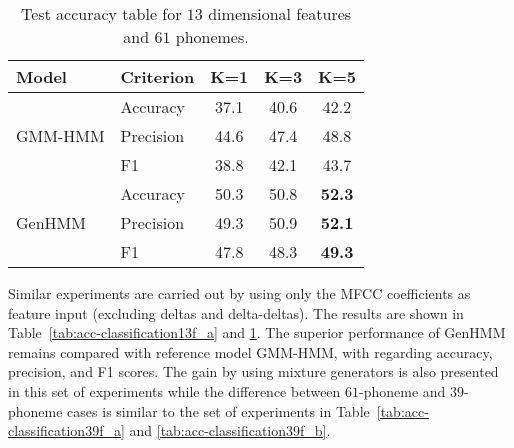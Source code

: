 \begin{table}
  \caption{Test accuracy table for $13$ dimensional features and $61$
    phonemes.}\label{tab:acc-classification13f_b}
  \centering
  \begin{tabular}{llccc}
    \toprule
    {Model} & Criterion &  K=1 &  K=3 &  K=5 \\ \midrule
    \multirow{3}{*}{GMM-HMM}
            & Accuracy & 37.1 &  40.6 & 42.2  \\
            &Precision & 44.6 &  47.4 & 48.8  \\
            & F1       & 38.8 &  42.1 & 43.7 \\
    \midrule
    \multirow{3}{*}{GenHMM}
            & Accuracy & 50.3 & 50.8 & \textbf{52.3}   \\
            & Precision& 49.3 & 50.9 & \textbf{52.1} \\
            &F1        & 47.8 & 48.3 & \textbf{49.3} \\
    \bottomrule
  \end{tabular}
  \vspace{0.5cm}
\end{table}

Similar experiments are carried out by using only the MFCC coefficients as feature input (excluding deltas and delta-deltas). The results are shown in Table~\ref{tab:acc-classification13f_a} and \ref{tab:acc-classification13f_b}. The superior performance of GenHMM remains compared with reference model GMM-HMM, with regarding accuracy, precision, and F1 scores. The gain by using mixture generators is also presented in this set of experiments while the difference between $61$-phoneme and $39$-phoneme cases is similar to the set of experiments in Table~\ref{tab:acc-classification39f_a} and \ref{tab:acc-classification39f_b}.

